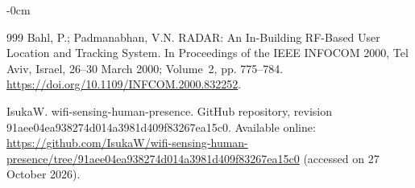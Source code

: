 \documentclass[sensors,article,submit,oneauthor]{Definitions/mdpi}
\begin{document}
\begin{adjustwidth}{-\extralength}{0cm}
{\begin{thebibliography}{999}
Bahl, P.; Padmanabhan, V.N. RADAR: An In-Building RF-Based User Location and Tracking System. In Proceedings of the IEEE INFOCOM 2000, Tel Aviv, Israel, 26--30 March 2000; Volume~2, pp. 775--784. \url{https://doi.org/10.1109/INFCOM.2000.832252}.


IsukaW. wifi-sensing-human-presence. GitHub repository, revision 91aee04ea938274d014a3981d409f83267ea15c0. Available online: \url{https://github.com/IsukaW/wifi-sensing-human-presence/tree/91aee04ea938274d014a3981d409f83267ea15c0} (accessed on 27 October 2026).

\end{thebibliography}
}

\end{adjustwidth}
\end{document}
